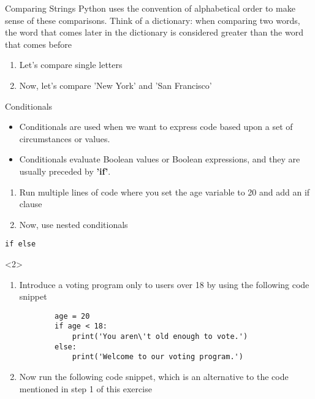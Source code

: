 \documentclass[../main.tex]{subfiles}
\begin{document}
\begin{frame}[fragile]{Comparing Strings}
  Python uses the convention of alphabetical order to make sense of these comparisons. Think of a dictionary: when comparing two words, the word that comes later in the
  dictionary is considered greater than the word that comes before
  \begin{exercise}{}
    \begin{enumerate}
    \item Let's compare single letters
    \item Now, let's compare 'New York' and 'San Francisco'
    \end{enumerate}
  \end{exercise}
\end{frame}

\begin{frame}[fragile]{Conditionals}
  \begin{itemize} \justifying
  \item   Conditionals are used when we want to express code based upon a set of circumstances or values. 
  \item Conditionals evaluate Boolean values or Boolean expressions, and they are usually preceded by \textbf{'if'}.
  \end{itemize}
  
  \begin{exercise}{}
    \begin{enumerate} \justifying
  \item Run multiple lines of code where you set the age variable to 20 and add an if clause
  \item Now, use nested conditionals 
    \end{enumerate}
  \end{exercise}
\end{frame}

\begin{frame}[fragile]{\texttt{if else}}
  

\begin{onlyenv}<2>
    \begin{exercise}{}
    \begin{enumerate} \justifying
    \item Introduce a voting program only to users over 18 by using the following code snippet
      \begin{lstlisting}
        age = 20
        if age < 18:
            print('You aren\'t old enough to vote.')
        else:
            print('Welcome to our voting program.')
      \end{lstlisting}
    \item Now run the following code snippet, which is an alternative to the code mentioned in step 1 of this exercise
    \end{enumerate}
\end{exercise}
\end{onlyenv}
\end{frame}
\end{document}
